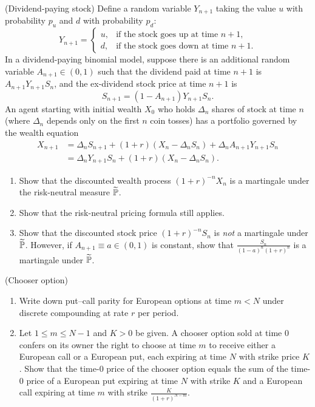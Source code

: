 \begin{problem}
    (Dividend-paying stock) Define a random variable $Y_{n+1}$ taking the value $u$ with probability $p_u$ and $d$ with probability $p_d$:
    \[
    Y_{n+1} = \begin{cases}
    u, & \text{if the stock goes up at time } n+1, \\
    d, & \text{if the stock goes down at time } n+1.
    \end{cases}
    \]
    In a dividend-paying binomial model, suppose there is an additional random variable $A_{n+1} \in (0, 1)$ such that the dividend paid at time $n+1$ is $A_{n+1} Y_{n+1} S_n$, and the ex-dividend stock price at time $n+1$ is
    \[
    S_{n+1} = (1 - A_{n+1}) Y_{n+1} S_n.
    \]
    An agent starting with initial wealth $X_0$ who holds $\Delta_n$ shares of stock at time $n$ (where $\Delta_n$ depends only on the first $n$ coin tosses) has a portfolio governed by the wealth equation
    \begin{align*}
    X_{n+1} &= \Delta_n S_{n+1} + (1+r)(X_n - \Delta_n S_n) + \Delta_n A_{n+1} Y_{n+1} S_n \\
    &= \Delta_n Y_{n+1} S_n + (1+r)(X_n - \Delta_n S_n).
    \end{align*}
    \begin{enumerate}
        \item Show that the discounted wealth process $(1+r)^{-n} X_n$ is a martingale under the risk-neutral measure $\widetilde{\mathbb{P}}$.
        \item Show that the risk-neutral pricing formula still applies.
        \item Show that the discounted stock price $(1+r)^{-n} S_n$ is \emph{not} a martingale under $\widetilde{\mathbb{P}}$. However, if $A_{n+1} \equiv a \in (0, 1)$ is constant, show that $\frac{S_n}{(1-a)^n (1+r)^n}$ is a martingale under $\widetilde{\mathbb{P}}$.
    \end{enumerate}
\end{problem}

\begin{problem}
    (Chooser option)
    \begin{enumerate}
        \item Write down put--call parity for European options at time $m < N$ under discrete compounding at rate $r$ per period.
        \item Let $1 \leq m \leq N-1$ and $K > 0$ be given. A chooser option sold at time $0$ confers on its owner the right to choose at time $m$ to receive either a European call or a European put, each expiring at time $N$ with strike price $K$. Show that the time-$0$ price of the chooser option equals the sum of the time-$0$ price of a European put expiring at time $N$ with strike $K$ and a European call expiring at time $m$ with strike $\frac{K}{(1+r)^{N-m}}$.
    \end{enumerate}
\end{problem}

